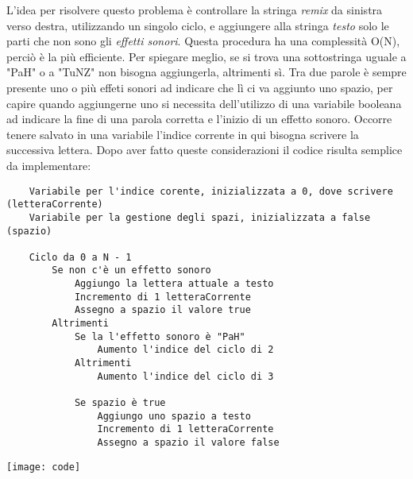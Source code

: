 
L'idea per risolvere questo problema è controllare la stringa \textit{remix} da sinistra verso destra, utilizzando un singolo ciclo, e aggiungere alla stringa \textit{testo} solo le parti che non sono gli \textit{effetti sonori}.\newline
Questa procedura ha una complessità O(N), perciò è la più efficiente.
Per spiegare meglio, se si trova una sottostringa uguale a "PaH" o a "TuNZ" non bisogna aggiungerla, altrimenti sì.\newline
Tra due parole è sempre presente uno o più effeti sonori ad indicare che lì ci va aggiunto uno spazio, per capire quando aggiungerne uno si necessita dell'utilizzo di una variabile booleana ad indicare la fine di una parola corretta e l'inizio di un effetto sonoro.\newline
Occorre tenere salvato in una variabile l'indice corrente in qui bisogna scrivere la successiva lettera.\newline\newline
Dopo aver fatto queste considerazioni il codice risulta semplice da implementare:\newline
\begin{verbatim}
    Variabile per l'indice corente, inizializzata a 0, dove scrivere (letteraCorrente)
    Variabile per la gestione degli spazi, inizializzata a false (spazio)
    
    Ciclo da 0 a N - 1
        Se non c'è un effetto sonoro
            Aggiungo la lettera attuale a testo
            Incremento di 1 letteraCorrente
            Assegno a spazio il valore true
        Altrimenti
            Se la l'effetto sonoro è "PaH"
                Aumento l'indice del ciclo di 2
            Altrimenti
                Aumento l'indice del ciclo di 3
            
            Se spazio è true
                Aggiungo uno spazio a testo
                Incremento di 1 letteraCorrente
                Assegno a spazio il valore false
\end{verbatim}
\Code
\texttt{[image: code]}